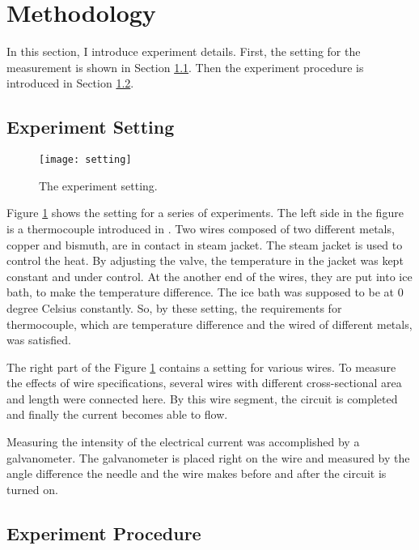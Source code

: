 
\section{Methodology}

In this section, I introduce experiment details.
First, the setting for the measurement is shown in Section \ref{subsection:setting}.
Then the experiment procedure is introduced in Section \ref{subsection:procedure}.

\subsection{Experiment Setting}
\label{subsection:setting}

\begin{figure}[!t]
  \centering
  \texttt{[image: setting]}
  \caption{The experiment setting.}
  \label{figure:setting}
\end{figure}

Figure \ref{figure:setting} shows the setting for a series of experiments.
The left side in the figure is a thermocouple introduced in \cite{thermocouple}.
Two wires composed of two different metals, copper and bismuth, are in contact in steam jacket.
The steam jacket is used to control the heat.
By adjusting the valve, the temperature in the jacket was kept constant and under control.
At the another end of the wires, they are put into ice bath, to make the temperature difference.
The ice bath was supposed to be at 0 degree Celsius constantly.
So, by these setting, the requirements for thermocouple, which are temperature difference and the wired of different metals, was satisfied.

The right part of the Figure \ref{figure:setting} contains a setting for various wires.
To measure the effects of wire specifications, several wires with different cross-sectional area and length were connected here.
By this wire segment, the circuit is completed and finally the current becomes able to flow.

Measuring the intensity of the electrical current was accomplished by a galvanometer.
The galvanometer is placed right on the wire and measured by the angle difference the needle and the wire makes before and after the circuit is turned on.

\subsection{Experiment Procedure}
\label{subsection:procedure}

